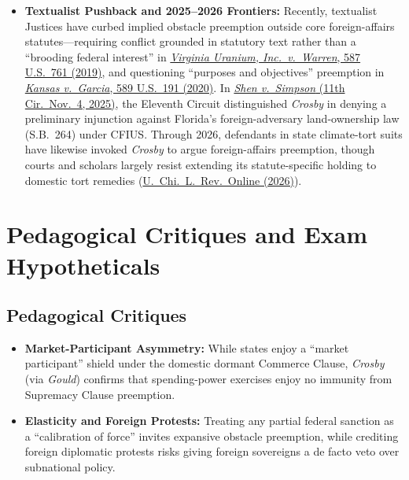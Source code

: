 \documentclass[12pt]{article}
\begin{document}
\begin{itemize}
    \item \textbf{Textualist Pushback and 2025--2026 Frontiers:} Recently, textualist Justices have curbed implied obstacle preemption outside core foreign-affairs statutes---requiring conflict grounded in statutory text rather than a ``brooding federal interest'' in \href{https://www.law.cornell.edu/supremecourt/text/16-1275}{\textit{Virginia Uranium, Inc.\ v.\ Warren}, 587 U.S.\ 761 (2019)}, and questioning ``purposes and objectives'' preemption in \href{https://www.scotusblog.com/2020/03/opinion-analysis-divided-court-permits-state-identity-theft-prosecution-of-noncitizens-in-the-employment-process/}{\textit{Kansas v.\ Garcia}, 589 U.S.\ 191 (2020)}. In \href{https://media.ca11.uscourts.gov/opinions/pub/files/202312737.pdf}{\textit{Shen v.\ Simpson} (11th Cir.\ Nov.\ 4, 2025)}, the Eleventh Circuit distinguished \textit{Crosby} in denying a preliminary injunction against Florida's foreign-adversary land-ownership law (S.B.\ 264) under CFIUS. Through 2026, defendants in state climate-tort suits have likewise invoked \textit{Crosby} to argue foreign-affairs preemption, though courts and scholars largely resist extending its statute-specific holding to domestic tort remedies (\href{https://lawreview.uchicago.edu/online-archive/polluter-pays-principle-and-its-enemies-corporate-fraud-weaponizing-preemption-and}{U.\ Chi.\ L.\ Rev.\ Online (2026)}).
\end{itemize}

\section{Pedagogical Critiques and Exam Hypotheticals}

\subsection{Pedagogical Critiques}
\begin{itemize}
    \item \textbf{Market-Participant Asymmetry:} While states enjoy a ``market participant'' shield under the domestic dormant Commerce Clause, \textit{Crosby} (via \textit{Gould}) confirms that spending-power exercises enjoy no immunity from Supremacy Clause preemption.
    \item \textbf{Elasticity and Foreign Protests:} Treating any partial federal sanction as a ``calibration of force'' invites expansive obstacle preemption, while crediting foreign diplomatic protests risks giving foreign sovereigns a de facto veto over subnational policy.
\end{itemize}
\end{document}
